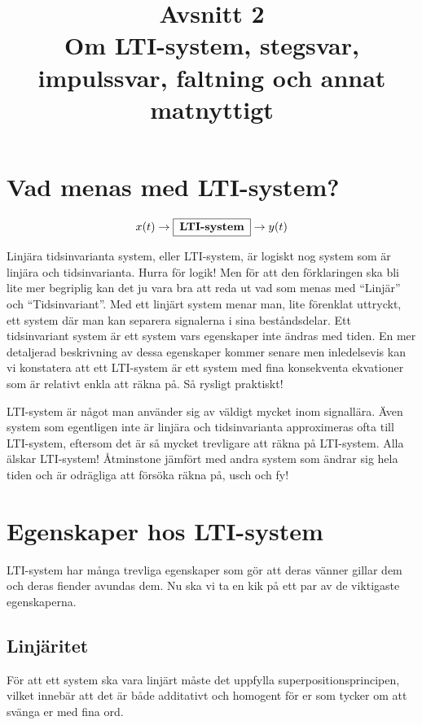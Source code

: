 \documentclass{article}
\title{Avsnitt 2 \\
\large Om LTI-system, stegsvar, impulssvar, faltning och annat matnyttigt}
\author{ }
\date{}
\begin{document}
\maketitle

\section{Vad menas med LTI-system?}
$$x(t) \rightarrow \framebox[1.2\width]{\textbf{LTI-system}} \rightarrow y(t) $$

Linjära tidsinvarianta system, eller LTI-system, är logiskt nog system som är
linjära och tidsinvarianta. Hurra för logik! Men för att den förklaringen ska
bli lite mer begriplig kan det ju vara bra att reda ut vad som menas med
“Linjär” och “Tidsinvariant”. Med ett linjärt system menar man, lite
förenklat uttryckt, ett system där man kan separera signalerna i sina
beståndsdelar. Ett tidsinvariant system är ett system vars egenskaper inte
ändras med tiden. En mer detaljerad beskrivning av dessa egenskaper kommer
senare men inledelsevis kan vi konstatera att ett LTI-system är ett system
med fina konsekventa ekvationer som är relativt enkla att räkna på. Så
rysligt praktiskt!


\newline
LTI-system är något man använder sig av väldigt mycket inom signallära. Även
system som egentligen inte är linjära och tidsinvarianta approximeras ofta
till LTI-system, eftersom det är så mycket trevligare att räkna på
LTI-system. Alla älskar LTI-system! Åtminstone jämfört med andra system som
ändrar sig hela tiden och är odrägliga att försöka räkna på, usch och fy!

\section{Egenskaper hos LTI-system}

LTI-system har många trevliga egenskaper som gör att deras vänner gillar
dem och deras fiender avundas dem. Nu ska vi ta en kik på ett par av de viktigaste egenskaperna.


\subsection{Linjäritet}
För att ett system ska vara linjärt måste det uppfylla
superpositionsprincipen, vilket innebär att det är både  additativt och
homogent för er som tycker om att svänga er med fina ord.
\end{document}
